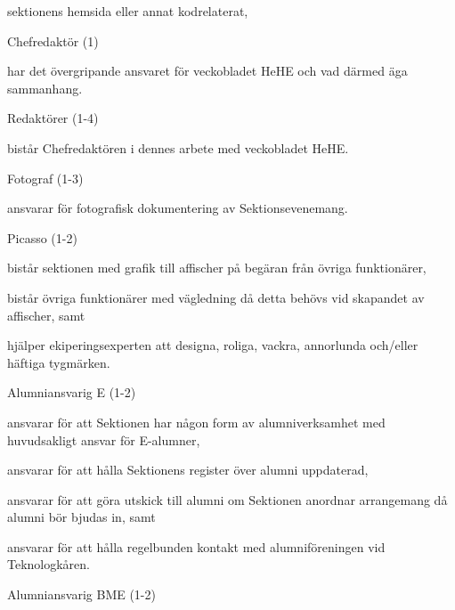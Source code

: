 \documentclass[10pt]{article}
\begin{document}
\begin{emptylist}
\begin{dashlist}
                sektionens hemsida eller annat kodrelaterat,
        \end{dashlist}
    \item Chefredaktör (1)
    		\begin{dashlist}
    			\item har det övergripande ansvaret för veckobladet HeHE och vad därmed äga sammanhang.
    		\end{dashlist}
    	\item Redaktörer (1-4)
    		\begin{dashlist}
    			\item bistår Chefredaktören i dennes arbete med veckobladet HeHE.
    		\end{dashlist}
    \item Fotograf (1-3)
        \begin{dashlist}
            \item ansvarar för fotografisk dokumentering av Sektionsevenemang.
        \end{dashlist}
    \item Picasso (1-2)
		\begin{dashlist}
            \item bistår sektionen med grafik till affischer på begäran från övriga funktionärer,
            \item bistår övriga funktionärer med vägledning då detta behövs vid skapandet av affischer, samt
            \item hjälper ekiperingsexperten att designa, roliga, vackra, annorlunda och/eller häftiga tygmärken.
        \end{dashlist}
    \item Alumniansvarig E (1-2)
        \begin{dashlist}
            \item ansvarar för att Sektionen har någon form av alumniverksamhet med huvudsakligt ansvar för E-alumner,
            \item ansvarar för att hålla Sektionens register över alumni uppdaterad,
            \item ansvarar för att göra utskick till alumni om Sektionen anordnar arrangemang då alumni
bör bjudas in, samt
            \item  ansvarar för att hålla regelbunden kontakt med alumniföreningen vid Teknologkåren.
        \end{dashlist}
    \item Alumniansvarig BME (1-2)
        \begin{dashlist}

\end{dashlist}
\end{emptylist}
\end{document}
